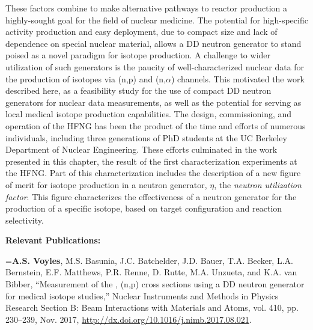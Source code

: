 These factors combine to make alternative pathways to reactor production a highly-sought goal for the field of nuclear medicine.
The potential for high-specific activity production and easy deployment, due to compact size and lack of dependence on special nuclear material, allows a DD neutron generator to stand poised as a novel paradigm for isotope production.
A challenge to wider utilization of  such generators  is the paucity of well-characterized nuclear data for the production of isotopes via (n,p) and (n,$\alpha$) channels.
This motivated the work described here, as a feasibility study for the use of compact DD neutron generators for nuclear data measurements, as well as the potential for serving as local medical isotope production capabilities.
The design, commissioning, and operation of the HFNG has been the product of the time and efforts of numerous individuals, including three generations of PhD students at the UC Berkeley Department of Nuclear Engineering. 
These efforts culminated in the work presented in this chapter, the result of the first characterization experiments  at the HFNG.
Part of this characterization includes the description of a new figure of merit for isotope production in a neutron generator, $\eta$, the \emph{neutron utilization factor}.
This figure  characterizes the effectiveness of a neutron generator for the production of a specific isotope, based on target configuration and reaction selectivity.


\vspace{1cm}



\noindent \textbf{Relevant Publications:}

\vspace{0.5cm}


\hangindent=\parindent  \textbf{A.S. Voyles}, M.S. Basunia, J.C. Batchelder, J.D. Bauer, T.A. Becker, L.A. Bernstein, E.F. Matthews, P.R. Renne, D. Rutte, M.A. Unzueta, and K.A. van Bibber, \enquote{Measurement of the , (n,p) cross sections using a DD neutron generator for medical isotope studies,} Nuclear Instruments and Methods in Physics Research Section B: Beam Interactions with Materials and Atoms, vol. 410, pp. 230--239, Nov. 2017, \url{http://dx.doi.org/10.1016/j.nimb.2017.08.021}. \cite{Voyles2017} 



